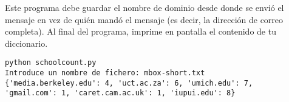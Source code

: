 \begin{ex}
Este programa debe guardar el nombre de dominio
desde donde se envió el mensaje en vez de quién mandó el mensaje
(es decir, la dirección de correo completa). Al final
del programa, imprime en pantalla el contenido de tu diccionario.

\beforeverb
\begin{verbatim}
python schoolcount.py
Introduce un nombre de fichero: mbox-short.txt
{'media.berkeley.edu': 4, 'uct.ac.za': 6, 'umich.edu': 7, 
'gmail.com': 1, 'caret.cam.ac.uk': 1, 'iupui.edu': 8}
\end{verbatim}
\afterverb
\end{ex}